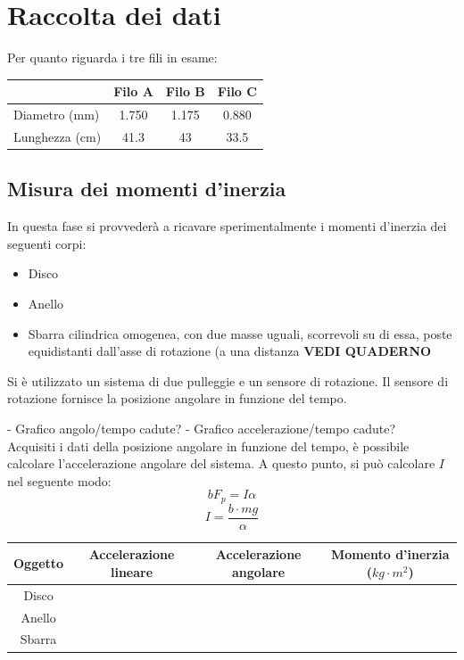 \section{Raccolta dei dati}
Per quanto riguarda i tre fili in esame:
\begin{center}

\begin{tabular}{l|c|c|c|}
 & Filo A & Filo B & Filo C \\
\midrule
Diametro (mm) & 1.750 & 1.175 & 0.880 \\
Lunghezza (cm) & 41.3 &  43 & 33.5 \\
\midrule
\end{tabular}\end{center}

\subsection{Misura dei momenti d'inerzia}

In questa fase si provvederà a ricavare  sperimentalmente i momenti d'inerzia dei seguenti corpi:
\begin{itemize}
\item Disco 
\item Anello
\item Sbarra cilindrica omogenea, con due masse uguali, scorrevoli su di essa, poste equidistanti dall’asse di rotazione (a una distanza \textbf{VEDI QUADERNO}
\end{itemize}

Si è utilizzato un sistema di due pulleggie e un sensore di rotazione.
Il sensore di rotazione fornisce la posizione angolare in funzione del tempo. 



- Grafico angolo/tempo cadute?
- Grafico accelerazione/tempo cadute?
\\
Acquisiti i dati della posizione angolare in funzione del tempo, è possibile calcolare l'accelerazione angolare del sistema. A questo punto, si può calcolare $I$ nel seguente modo:
$$ bF_p = I\alpha $$
$$ I = \frac{b\cdot mg}{\alpha} $$

\begin{center}
\begin{tabular}{c|ccc}
Oggetto & Accelerazione lineare & Accelerazione angolare & Momento d'inerzia ($kg\cdot m^2$) \\
\midrule
Disco & \\
Anello & \\
Sbarra &\\
\end{tabular}
\end{center}

